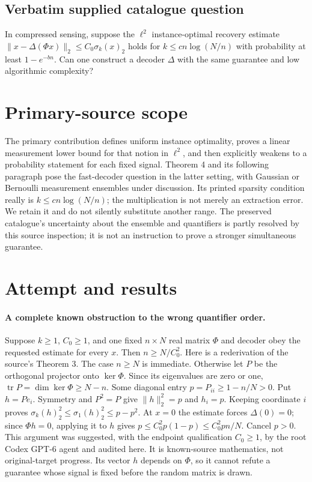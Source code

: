 \documentclass[11pt]{article}
\begin{document}
\subsection{Verbatim supplied catalogue question}
In compressed sensing, suppose the $\ell^2$ instance-optimal recovery estimate $\lVert x-\Delta(\Phi x)\rVert_2\leq C_0\sigma_k(x)_2$ holds for $k\leq cn\log(N/n)$ with probability at least $1-e^{-bn}$. Can one construct a decoder $\Delta$ with the same guarantee and low algorithmic complexity?

\section{Primary-source scope}
The primary contribution defines uniform instance optimality, proves a linear
measurement lower bound for that notion in $\ell^2$, and then explicitly weakens
to a probability statement for each fixed signal. Theorem 4 and its following
paragraph pose the fast-decoder question in the latter setting, with Gaussian
or Bernoulli measurement ensembles under discussion. Its printed sparsity
condition really is $k\le cn\log(N/n)$; the multiplication is not merely an
extraction error. We retain it and do not silently substitute another range.
The preserved catalogue's uncertainty about the ensemble and quantifiers is
partly resolved by this source inspection; it is not an instruction to prove
a stronger simultaneous guarantee.

\section{Attempt and results}
\paragraph{A complete known obstruction to the wrong quantifier order.}
Suppose $k\ge1$, $C_0\ge1$, and one fixed $n\times N$ real matrix $\Phi$
and decoder obey the requested estimate for every $x$. Then
$n\ge N/C_0^2$. Here is a rederivation of the source's Theorem 3.
The case $n\ge N$ is immediate. Otherwise let $P$ be the orthogonal
projector onto $\ker\Phi$. Since its eigenvalues are zero or one,
$\operatorname{tr}P=\dim\ker\Phi\ge N-n$. Some diagonal entry
$p=P_{ii}\ge1-n/N>0$. Put $h=Pe_i$. Symmetry and $P^2=P$ give
$\|h\|_2^2=p$ and $h_i=p$. Keeping coordinate $i$ proves
$\sigma_k(h)_2^2\le\sigma_1(h)_2^2\le p-p^2$.
At $x=0$ the estimate forces $\Delta(0)=0$; since $\Phi h=0$, applying
it to $h$ gives $p\le C_0^2p(1-p)\le C_0^2pn/N$. Cancel $p>0$.
This argument was suggested, with the endpoint qualification $C_0\ge1$,
by the root Codex GPT-6 agent and audited here. It is known-source mathematics,
not original-target progress. Its vector $h$ depends on $\Phi$, so it cannot
refute a guarantee whose signal is fixed before the random matrix is drawn.
\end{document}
